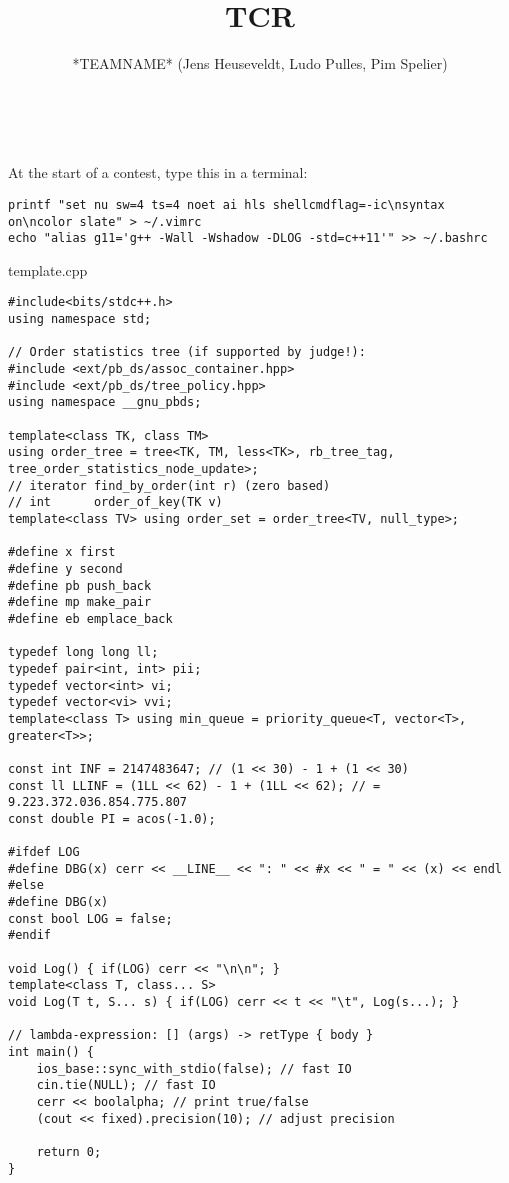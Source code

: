 \documentclass{article}
\title{TCR}
\author{*TEAMNAME* (Jens Heuseveldt, Ludo Pulles, Pim Spelier)}
\begin{document}
\maketitle
\begin{center}
	\makeatletter
	\textbf{\@title} \\
	\emph{\@author}
	\makeatother
\end{center}

\tableofcontents

\begin{center}
At the start of a contest, type this in a terminal:
\end{center}

\begin{lstlisting}
printf "set nu sw=4 ts=4 noet ai hls shellcmdflag=-ic\nsyntax on\ncolor slate" > ~/.vimrc
echo "alias g11='g++ -Wall -Wshadow -DLOG -std=c++11'" >> ~/.bashrc
\end{lstlisting}

\begin{center}
template.cpp
\end{center}

\begin{lstlisting}
#include<bits/stdc++.h>
using namespace std;

// Order statistics tree (if supported by judge!):
#include <ext/pb_ds/assoc_container.hpp>
#include <ext/pb_ds/tree_policy.hpp>
using namespace __gnu_pbds;

template<class TK, class TM>
using order_tree = tree<TK, TM, less<TK>, rb_tree_tag, tree_order_statistics_node_update>;
// iterator	find_by_order(int r) (zero based)
// int		order_of_key(TK v)
template<class TV> using order_set = order_tree<TV, null_type>;

#define x first
#define y second
#define pb push_back
#define mp make_pair
#define eb emplace_back

typedef long long ll;
typedef pair<int, int> pii;
typedef vector<int> vi;
typedef vector<vi> vvi;
template<class T> using min_queue = priority_queue<T, vector<T>, greater<T>>;

const int INF = 2147483647; // (1 << 30) - 1 + (1 << 30)
const ll LLINF = (1LL << 62) - 1 + (1LL << 62); // = 9.223.372.036.854.775.807
const double PI = acos(-1.0);

#ifdef LOG
#define DBG(x) cerr << __LINE__ << ": " << #x << " = " << (x) << endl
#else
#define DBG(x)
const bool LOG = false;
#endif

void Log() { if(LOG) cerr << "\n\n"; }
template<class T, class... S>
void Log(T t, S... s) { if(LOG) cerr << t << "\t", Log(s...); }

// lambda-expression: [] (args) -> retType { body }
int main() {
	ios_base::sync_with_stdio(false); // fast IO
	cin.tie(NULL); // fast IO
	cerr << boolalpha; // print true/false
	(cout << fixed).precision(10); // adjust precision

	return 0;
}
\end{lstlisting}
\end{document}
